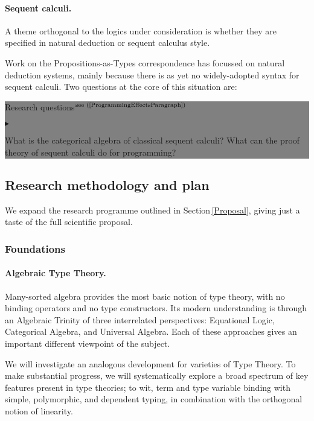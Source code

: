 \documentclass[11pt,twocolumn]{article}
\newenvironment{btritemize}
  {\begin{list}{\btr}
  {\setlength{\topsep}{2pt}
   \setlength{\partopsep}{2pt}
   \setlength{\itemsep}{2.5pt}
   \setlength{\parsep}{2.5pt}
   \setlength{\leftmargin}{1em}
   \setlength{\labelwidth}{.5em}}}
  {\end{list}}
\newcommand{\mytextsf}[1]{\textsf{\small #1}}
\newcommand{\hl}[1]{#1}%
\newcommand{\btr}{$\blacktriangleright$}
\newcommand{\reqpsize}{8.113395cm}%
\newcommand{\req}[2]{\begin{center}\colorbox{grey}{\begin{minipage}{\reqpsize} 
  \mytextsf{Research question}\hfill$^{\mbox{\scriptsize see (#1) }}$\\[-5.5mm]
  \begin{btritemize}
  \item #2
  \end{btritemize}
\end{minipage}}\end{center}}
\newcommand{\reqs}[2]{\begin{center}\colorbox{grey}{\begin{minipage}{\reqpsize}
  \mytextsf{Research questions}\hfill$^{\mbox{\scriptsize see (#1) }}$\\[-5.5mm]
  \begin{btritemize}
  \item #2
  \end{btritemize}
\end{minipage}}\end{center}}
\begin{document}
\paragraph*{Sequent calculi.}

A theme orthogonal to the logics under consideration is whether they are
specified in natural deduction or sequent calculus style. 

Work on the Propositions-as-Types correspondence has focussed on natural
deduction systems, mainly because there is as yet no 
widely-adopted %
syntax for sequent calculi.  Two questions at the core of this situation
are:
%
\reqs{\ref{ProgrammingEffectsParagraph}}
  {What is the categorical algebra of classical sequent calculi? %
%
  What can the proof theory of sequent calculi do for programming?}

\subsection{Research methodology and plan}

We expand the research programme outlined in Section\,\ref{Proposal}, giving
just a taste of the full scientific proposal.

\subsubsection{Foundations}
\label{Foundations}

\paragraph{Algebraic Type Theory.}
\label{AlgebraicTypeTheoryParagraph}

Many-sorted algebra provides the most basic notion of type theory, with no
binding operators and no type constructors.  Its modern understanding is
through an Algebraic Trinity of three interrelated perspectives: Equational
Logic, Categorical Algebra, and Universal Algebra.
Each of these approaches gives an important different viewpoint of the
subject.

We will \hl{investigate} an analogous development for varieties of Type
Theory.  To make substantial prog\-ress, we will systematically explore a broad
spectrum of key features present in type theories; to wit, term and type
variable binding with simple, polymorphic, and dependent typing, in
combination with the orthogonal notion of linearity.  
\end{document}
